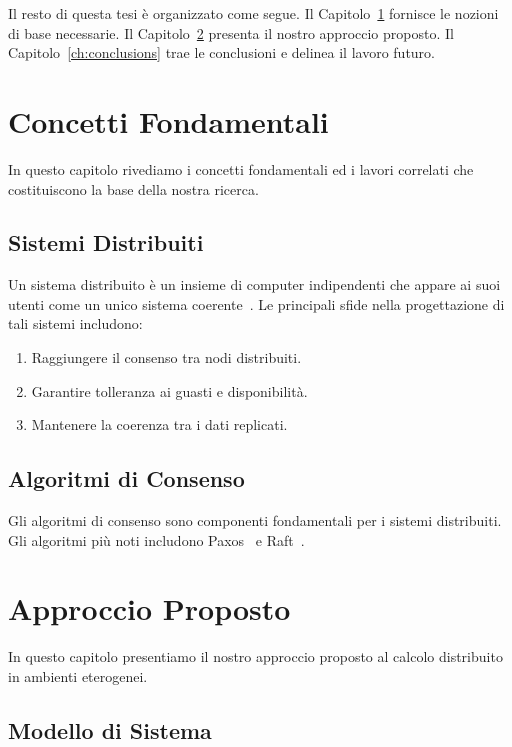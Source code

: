 \documentclass[master,italian,fem,lof,lot]{tvthesis}
\begin{document}
Il resto di questa tesi è organizzato come segue. Il Capitolo~\ref{ch:background} fornisce le nozioni di base necessarie. Il Capitolo~\ref{ch:proposal} presenta il nostro approccio proposto. Il Capitolo~\ref{ch:conclusions} trae le conclusioni e delinea il lavoro futuro.


\chapter{Concetti Fondamentali}
\label{ch:background}

In questo capitolo rivediamo i concetti fondamentali ed i lavori correlati che costituiscono la base della nostra ricerca.

\section{Sistemi Distribuiti}

Un sistema distribuito è un insieme di computer indipendenti che appare ai suoi utenti come un unico sistema coerente~\cite{tanenbaum2007}. Le principali sfide nella progettazione di tali sistemi includono:
\begin{enumerate}
    \item Raggiungere il consenso tra nodi distribuiti.
    \item Garantire tolleranza ai guasti e disponibilità.
    \item Mantenere la coerenza tra i dati replicati.
\end{enumerate}

\section{Algoritmi di Consenso}

Gli algoritmi di consenso sono componenti fondamentali per i sistemi distribuiti. Gli algoritmi più noti includono Paxos~\cite{lamport1998} e Raft~\cite{ongaro2014}.

\lipsum[1-2]


\chapter{Approccio Proposto}
\label{ch:proposal}

In questo capitolo presentiamo il nostro approccio proposto al calcolo distribuito
in ambienti eterogenei.

\section{Modello di Sistema}
\end{document}
